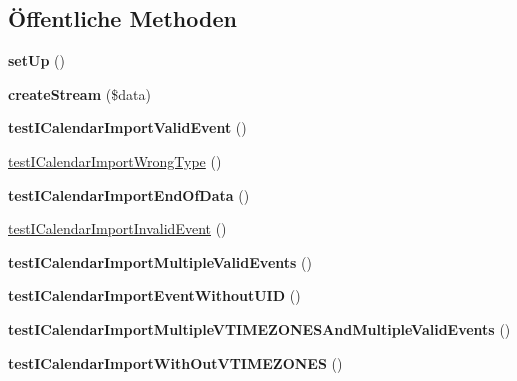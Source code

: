 \subsection*{Öffentliche Methoden}
\begin{DoxyCompactItemize}
\item 
\mbox{\label{class_sabre_1_1_v_object_1_1_splitter_1_1_i_calendar_test_a4f4bf2ff8fd1896bb59598a06af84992}} 
{\bfseries set\+Up} ()
\item 
\mbox{\label{class_sabre_1_1_v_object_1_1_splitter_1_1_i_calendar_test_a05f47031087770bd5cb8eb8d29509aaf}} 
{\bfseries create\+Stream} (\$data)
\item 
\mbox{\label{class_sabre_1_1_v_object_1_1_splitter_1_1_i_calendar_test_abb9ef20dee414908775b08c36cc2b787}} 
{\bfseries test\+I\+Calendar\+Import\+Valid\+Event} ()
\item 
\mbox{\hyperlink{class_sabre_1_1_v_object_1_1_splitter_1_1_i_calendar_test_ae11c5f92f17dd71b4dd9a65f58c1a9e1}{test\+I\+Calendar\+Import\+Wrong\+Type}} ()
\item 
\mbox{\label{class_sabre_1_1_v_object_1_1_splitter_1_1_i_calendar_test_afe4b5a1a8b4498433bd55760dfce2422}} 
{\bfseries test\+I\+Calendar\+Import\+End\+Of\+Data} ()
\item 
\mbox{\hyperlink{class_sabre_1_1_v_object_1_1_splitter_1_1_i_calendar_test_a6a9b0419746b7578bf38a9c7281cdec6}{test\+I\+Calendar\+Import\+Invalid\+Event}} ()
\item 
\mbox{\label{class_sabre_1_1_v_object_1_1_splitter_1_1_i_calendar_test_ad2cb25901cad14ced5e3867ae3471ad2}} 
{\bfseries test\+I\+Calendar\+Import\+Multiple\+Valid\+Events} ()
\item 
\mbox{\label{class_sabre_1_1_v_object_1_1_splitter_1_1_i_calendar_test_aaaeaf360f8aa7cb7481a6ecd9a0ae16a}} 
{\bfseries test\+I\+Calendar\+Import\+Event\+Without\+U\+ID} ()
\item 
\mbox{\label{class_sabre_1_1_v_object_1_1_splitter_1_1_i_calendar_test_a73e94bc8d099b0534fe97e418f199846}} 
{\bfseries test\+I\+Calendar\+Import\+Multiple\+V\+T\+I\+M\+E\+Z\+O\+N\+E\+S\+And\+Multiple\+Valid\+Events} ()
\item 
\mbox{\label{class_sabre_1_1_v_object_1_1_splitter_1_1_i_calendar_test_a94fdf97684bc9822d8366ba1005f7670}} 
{\bfseries test\+I\+Calendar\+Import\+With\+Out\+V\+T\+I\+M\+E\+Z\+O\+N\+ES} ()
\end{DoxyCompactItemize}
